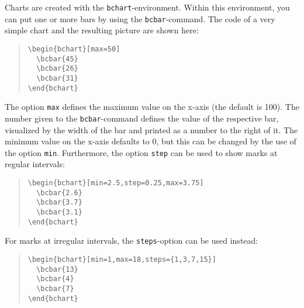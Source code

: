 \documentclass{article}
\begin{document}
Charts are created with the \texttt{bchart}-environment. Within this environment, you can put one or more bars by using the \texttt{bcbar}-command. The code of a very simple chart and the resulting picture are shown here:
\begin{quote}\small
\begin{verbatim}
\begin{bchart}[max=50]
  \bcbar{45}
  \bcbar{26}
  \bcbar{31}
\end{bchart}
\end{verbatim}
\end{quote}
\begin{quote}
\begin{bchart}[max=50]
\end{bchart}
\end{quote}
The option \texttt{max} defines the maximum value on the x-axis (the default is 100). The number given to the \texttt{bcbar}-command defines the value of the respective bar, visualized by the width of the bar and printed as a number to the right of it. The minimum value on the x-axis defaults to 0, but this can be changed by the use of the option \texttt{min}. Furthermore, the option \texttt{step} can be used to show marks at regular intervals:
\begin{quote}\small
\begin{verbatim}
\begin{bchart}[min=2.5,step=0.25,max=3.75]
  \bcbar{2.6}
  \bcbar{3.7}
  \bcbar{3.1}
\end{bchart}
\end{verbatim}
\end{quote}
\begin{quote}
\begin{bchart}[min=2.5,step=0.25,max=3.75]
\end{bchart}
\end{quote}
For marks at irregular intervals, the \texttt{steps}-option can be used instead:
\begin{quote}\small
\begin{verbatim}
\begin{bchart}[min=1,max=18,steps={1,3,7,15}]
  \bcbar{13}
  \bcbar{4}
  \bcbar{7}
\end{bchart}
\end{verbatim}
\end{quote}
\begin{quote}
\begin{bchart}[min=1,max=18,steps={1,3,7,15}]
\end{bchart}
\end{quote}
\end{document}
